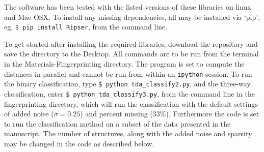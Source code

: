 \documentclass[10pt]{amsart}
\begin{document}
The software has been tested with the listed versions of these libraries on linux and Mac OSX.
To install any missing dependencies, all may be installed via `pip', eg,
\texttt{\$ pip install Ripser}, from the command line.

To get started after installing the required libraries, download
the repository and save the directory to the Desktop. All 
commands are to be run from the terminal in the Materials-Fingerprinting
directory. The program is set to compute the distances in parallel and
cannot be run from within an \texttt{ipython} session. 
To run the binary classification, type \texttt{\$ python tda\_classify2.py},
and the three-way classification, enter \texttt{\$ python tda\_classify3.py},
from the command line in the fingerprinting directory, which will run the 
classification with the default
settings of added noise ($\sigma=0.25$) and percent missing (33\%). 
Furthermore the code is set to
run the classification method on a subset of the data presented in the 
manuscript. The number of structures, along with the added noise and sparsity may be changed
in the code as described below.
\end{document}

